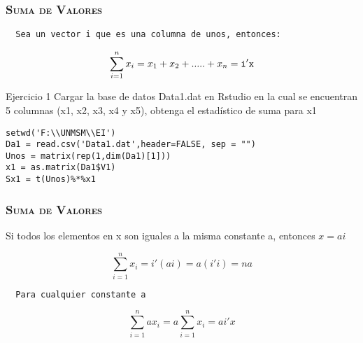 \documentclass[16.5pt]{beamer}
\begin{document}
{
\begin{frame}
\frametitle{\textsc{\textbf{Suma de Valores}}}
\hspace*{-5mm}
\vspace*{-5mm} 
\vspace{0.5cm}


\texttt{  {\color{blue} Sea un vector i que es una columna de unos, entonces:} }

$$\sum_{i=1}^n x_i = x_1 + x_2 + .....+ x_n = \color{black} \mathtt{i'x}$$



\begin{bclogo}{Ejercicio 1}
 {\small\color{blue} Cargar la base de datos Data1.dat en Rstudio en la cual se encuentran 5 columnas (x1, x2, x3, x4 y x5), obtenga el estadístico de suma para x1}
\begin{lstlisting}
setwd('F:\\UNMSM\\EI')
Da1 = read.csv('Data1.dat',header=FALSE, sep = "")
Unos = matrix(rep(1,dim(Da1)[1]))
x1 = as.matrix(Da1$V1)
Sx1 = t(Unos)%*%x1

\end{lstlisting}
\end{bclogo}

\end{frame}
}


{
\begin{frame}
\frametitle{\textsc{\textbf{Suma de Valores}}}
\hspace*{-5mm}
\vspace*{-5mm} 
\vspace{0.5cm}

{\color{blue} Si todos los elementos en x son iguales a la misma constante a, entonces $x=ai$} 

$$\sum_{i=1}^n x_i = i'(ai) = a(i'i) = na$$

\texttt{  {\color{blue} Para cualquier constante a} }

$$\sum_{i=1}^n a x_i =a\sum_{i=1}^n  x_i= ai'x$$

\end{frame}
}
\end{document}
